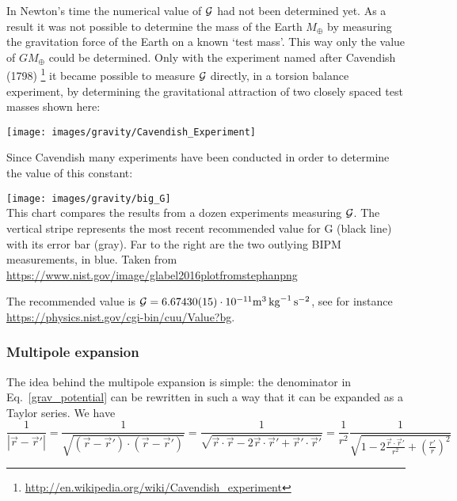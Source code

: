 In Newton's time the numerical value of ${\cal G}$ had not been
determined yet. 
As a result it was not possible to determine the mass of the 
Earth $M_{\oplus}$ by measuring the gravitation force of the Earth 
on a known `test mass'.
This way only the value of $G M_{\oplus}$ could be determined.
Only with the experiment named after Cavendish (1798)
\footnote{\url{http://en.wikipedia.org/wiki/Cavendish_experiment}}
it became possible
to measure ${\cal G}$ directly, in a torsion balance experiment,
by determining the gravitational attraction of two closely spaced test 
masses shown here:  

\begin{center}
\texttt{[image: images/gravity/Cavendish\_Experiment]}
\end{center}

Since Cavendish many experiments have been conducted in order to 
determine the value of this constant:

\begin{center}
\texttt{[image: images/gravity/big\_G]}\\
{\captionfont This chart compares the results from a dozen experiments measuring ${\cal G}$. 
The vertical stripe represents the most recent recommended value for G (black line) 
with its error bar (gray). Far to the right are the two outlying BIPM measurements, in blue.
Taken from \url{https://www.nist.gov/image/glabel2016plotfromstephanpng}}
\end{center}

The recommended value is ${\cal G}=6.67430(15)\cdot 10^{-11} \si{\cubic\meter\per\kg\per\square\second}$, 
see for instance \url{https://physics.nist.gov/cgi-bin/cuu/Value?bg}.

\subsubsection{Multipole expansion}

The idea behind the multipole expansion is simple: the denominator in Eq.~\eqref{grav_potential}
can be rewritten in such a way that it can be expanded as a Taylor series. 
We have 
\[
\frac{1}{|\vec{r}-\vec{r}'|} 
= \frac{1}{\sqrt{ (\vec{r}-\vec{r}') \cdot (\vec{r}-\vec{r}')   }}
= \frac{1}{\sqrt{ \vec{r}\cdot\vec{r} - 2 \vec{r}\cdot \vec{r}' + \vec{r}'\cdot \vec{r}'   }}
= \frac{1}{r^2} \frac{1}{\sqrt{ 1 - 2 \frac{\vec{r}\cdot \vec{r}'}{r^2} + \left(\frac{r'}{r} \right)^2   }}
\]

